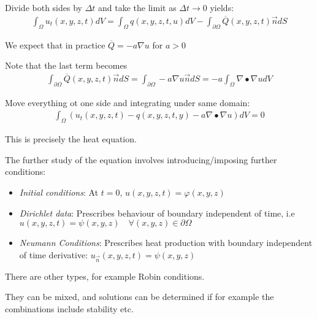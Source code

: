 \noindent Divide both sides by $\Delta t$ and take the limit as $\Delta t\to 0$ yields:
\begin{equation*}
  \begin{gathered}
    \int_\Omega u_t(x,y,z,t)dV = \int_\Omega q(x,y,z,t,u)dV-\int_{\partial \Omega}\overline{Q}(x,y,z,t)\overrightarrow{n}dS
  \end{gathered}
\end{equation*}\par
\noindent We expect that in practice $\overline{Q} = -a\nabla u$ for $a>0$\par
\noindent Note that the last term becomes
\begin{equation*}
  \begin{gathered}
    \int_{\partial \Omega}\overline{Q}(x,y,z,t)\overrightarrow{n}dS = \int_{\partial \Omega}-a\nabla u\overrightarrow{n}dS = -a\int_\Omega \nabla\bullet\nabla u dV
  \end{gathered}
\end{equation*}\par
\noindent Move everything ot one side and integrating under same domain:
\begin{equation*}
  \begin{gathered}
    \int_\Omega (u_t(x,y,z,t)-q(x,y,z,t,y)-a\nabla\bullet\nabla u)dV = 0
  \end{gathered}
\end{equation*}\par
This is precisely the heat equation.
\par\bigskip
\noindent The further study of the equation involves introducing/imposing further conditions:\par
\begin{itemize}
  \item \textit{Initial conditions}: At $t=0$, $u(x,y,z,t) = \varphi(x,y,z)$
  \item \textit{Dirichlet data}: Prescribes behaviour of boundary independent of time, i.e $u(x,y,z,t) = \psi(x,y,z)\quad\forall (x,y,z)\in\partial \Omega$
  \item \textit{Neumann Conditions}: Prescribes heat production with boundary independent of time derivative: $u_{\overrightarrow{n}}(x,y,z,t) = \psi(x,y,z)$
\end{itemize}
\par\bigskip
\noindent There are other types, for example Robin conditions.\par
\noindent They can be mixed, and solutions can be determined if for example the combinations include stability etc.
\par\bigskip
